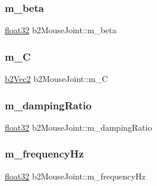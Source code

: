 \subsubsection{\texorpdfstring{m\_beta}{m\_beta}}
{\footnotesize\ttfamily \mbox{\hyperlink{b2_settings_8h_aacdc525d6f7bddb3ae95d5c311bd06a1}{float32}} b2\+Mouse\+Joint\+::m\+\_\+beta\hspace{0.3cm}{\ttfamily [protected]}}

\mbox{\label{classb2_mouse_joint_a7ea02e17cdde70717e84bf44614275fb}} 
\subsubsection{\texorpdfstring{m\_C}{m\_C}}
{\footnotesize\ttfamily \mbox{\hyperlink{structb2_vec2}{b2\+Vec2}} b2\+Mouse\+Joint\+::m\+\_\+C\hspace{0.3cm}{\ttfamily [protected]}}

\mbox{\label{classb2_mouse_joint_afdd1fd651a936ce0afc85decd67b7e1c}} 
\subsubsection{\texorpdfstring{m\_dampingRatio}{m\_dampingRatio}}
{\footnotesize\ttfamily \mbox{\hyperlink{b2_settings_8h_aacdc525d6f7bddb3ae95d5c311bd06a1}{float32}} b2\+Mouse\+Joint\+::m\+\_\+damping\+Ratio\hspace{0.3cm}{\ttfamily [protected]}}

\mbox{\label{classb2_mouse_joint_a17a95ce26e366e288ca19e65abf6fd6b}} 
\subsubsection{\texorpdfstring{m\_frequencyHz}{m\_frequencyHz}}
{\footnotesize\ttfamily \mbox{\hyperlink{b2_settings_8h_aacdc525d6f7bddb3ae95d5c311bd06a1}{float32}} b2\+Mouse\+Joint\+::m\+\_\+frequency\+Hz\hspace{0.3cm}{\ttfamily [protected]}}

